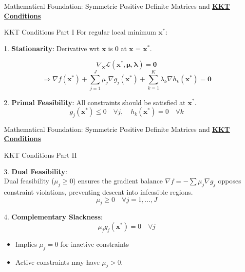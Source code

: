 \documentclass{beamer}
\begin{document}
\begin{frame}{{Mathematical Foundation: Symmetric Positive Definite Matrices and \textbf{\underline{KKT Conditions}}}}
\begin{block}{KKT Conditions Part I}
For regular local minimum $\bm{x}^*$:

1. \textbf{Stationarity}:
Derivative wrt $\bm{x}$ is 0 at $\bm{x}$ = $\bm{x}^*$.

\[
\nabla_{\bm{x}} \mathcal{L}(\bm{x}^*, \bm{\mu}, \bm{\lambda}) = \bm{0}
\]
\[
\Rightarrow \nabla f(\bm{x}^*) + \sum_{j=1}^J \mu_j \nabla g_j(\bm{x}^*) + \sum_{k=1}^K \lambda_k \nabla h_k(\bm{x}^*) = \bm{0}
\]


2. \textbf{Primal Feasibility}:
All constraints should be satisfied at $\bm{x^*}$.
\[
g_j(\bm{x}^*) \leq 0 \quad \forall j, \quad h_k(\bm{x}^*) = 0 \quad \forall k
\]

\end{block}
\end{frame}

\begin{frame}{{Mathematical Foundation: Symmetric Positive Definite Matrices and \textbf{\underline{KKT Conditions}}}}
\begin{block}{KKT Conditions Part II}

3. \textbf{Dual Feasibility}: \\
Dual feasibility ($\mu_j \geq 0$) ensures the gradient balance $\nabla f = -\sum \mu_j \nabla g_j$ opposes constraint violations, preventing descent into infeasible regions.
\[
\mu_j \geq 0 \quad \forall j = 1,\ldots,J
\]


4. \textbf{Complementary Slackness}:
\[
\mu_j g_j(\bm{x}^*) = 0 \quad \forall j
\]
\begin{itemize}
\item Implies $\mu_j = 0$ for inactive constraints
\item Active constraints may have $\mu_j > 0$.\\ 
\end{itemize}
\end{block}

\end{frame}
\end{document}
